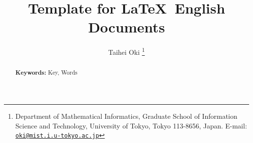 \documentclass[11pt,a4paper]{article}
\title{\texorpdfstring{%
  Template for \LaTeX\ English Documents
}{%
  Template for LaTeX English Documents
}}
\author{Taihei Oki%
  \texorpdfstring{\thanks{
    Department of Mathematical Informatics, Graduate School of Information Science and Technology, University of Tokyo, Tokyo 113-8656, Japan.
    E-mail: \href{mailto:oki@mist.i.u-tokyo.ac.jp}{\nolinkurl{oki@mist.i.u-tokyo.ac.jp}}
  }}{}
}
\newcommand{\mykeywords}{Key, Words}
\begin{document}
\maketitle

\begin{abstract}
  

  \bigskip\noindent\textbf{Keywords:} \mykeywords{}
\end{abstract}



\printbibliography[heading=bibintoc]
\end{document}
